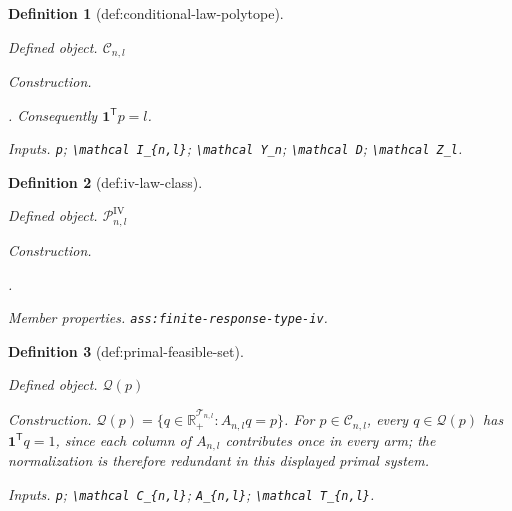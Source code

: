 \documentclass{article}
\newtheorem{definition}{Definition}
\begin{document}
\begin{definition}[def:conditional-law-polytope]\label{def:conditional-law-polytope}
\par\smallskip\noindent\emph{Defined object.} \(\mathcal C_{n,l}\)
\par\smallskip\noindent\emph{Construction.} \par\noindent {}\par\noindent. Consequently \(\mathbf 1^{\mathsf T}p=l\).
\par\smallskip\noindent\emph{Inputs.} \texttt{p}; \texttt{\textbackslash{}\allowbreak{}mathcal I\_\allowbreak{}\{n,\allowbreak{}l\}\allowbreak{}}; \texttt{\textbackslash{}\allowbreak{}mathcal Y\_\allowbreak{}n}; \texttt{\textbackslash{}\allowbreak{}mathcal D}; \texttt{\textbackslash{}\allowbreak{}mathcal Z\_\allowbreak{}l}.
\end{definition}

\begin{definition}[def:iv-law-class]\label{def:iv-law-class}
\par\smallskip\noindent\emph{Defined object.} \(\mathcal P^{\mathrm{IV}}_{n,l}\)
\par\smallskip\noindent\emph{Construction.} \par\noindent {}\par\noindent.
\par\smallskip\noindent\emph{Member properties.} \texttt{ass:\allowbreak{}finite-\allowbreak{}response-\allowbreak{}type-\allowbreak{}iv}.
\end{definition}

\begin{definition}[def:primal-feasible-set]\label{def:primal-feasible-set}
\par\smallskip\noindent\emph{Defined object.} \(\mathcal Q(p)\)
\par\smallskip\noindent\emph{Construction.} \(\mathcal Q(p)=\{q\in\mathbb R_+^{\mathcal T_{n,l}}:A_{n,l}q=p\}\). For \(p\in\mathcal C_{n,l}\), every \(q\in\mathcal Q(p)\) has \(\mathbf1^{\mathsf T}q=1\), since each column of \(A_{n,l}\) contributes once in every arm; the normalization is therefore redundant in this displayed primal system.
\par\smallskip\noindent\emph{Inputs.} \texttt{p}; \texttt{\textbackslash{}\allowbreak{}mathcal C\_\allowbreak{}\{n,\allowbreak{}l\}\allowbreak{}}; \texttt{A\_\allowbreak{}\{n,\allowbreak{}l\}\allowbreak{}}; \texttt{\textbackslash{}\allowbreak{}mathcal T\_\allowbreak{}\{n,\allowbreak{}l\}\allowbreak{}}.
\end{definition}
\end{document}
